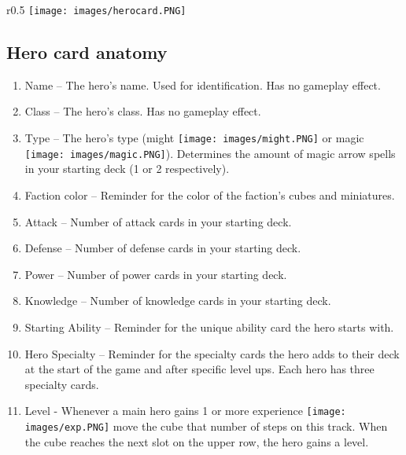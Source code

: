 \documentclass[12pt]{article}
\begin{document}
\clearpage

\begin{wrapfigure}{r}{0.5\textwidth}
\texttt{[image: images/herocard.PNG]} 
\end{wrapfigure}
\subsection*{\hypertarget{Herocard}{Hero card anatomy}}
\begin{enumerate}
\item Name – The hero’s name. Used for identification. Has no gameplay effect.
\item Class – The hero’s class. Has no gameplay effect.
\item Type – The hero’s type (might \texttt{[image: images/might.PNG]} or magic \texttt{[image: images/magic.PNG]}). Determines the amount of magic arrow spells in your starting deck (1 or 2 respectively).
\item Faction color – Reminder for the color of the faction’s cubes and miniatures.
\item Attack – Number of attack cards in your starting deck.
\item Defense – Number of defense cards in your starting deck.
\item Power – Number of power cards in your starting deck.
\item Knowledge – Number of knowledge cards in your starting deck.
\item Starting Ability – Reminder for the unique ability card the hero starts with.
\item Hero Specialty – Reminder for the specialty cards the hero adds to their deck at the start of the game and after specific level ups. Each hero has three specialty cards.
\item Level - Whenever a main hero gains 1 or more experience \texttt{[image: images/exp.PNG]} move the cube that number of steps on this track. When the cube reaches the next slot on the upper row, the hero gains a level.
\end{enumerate}
\clearpage
\end{document}
